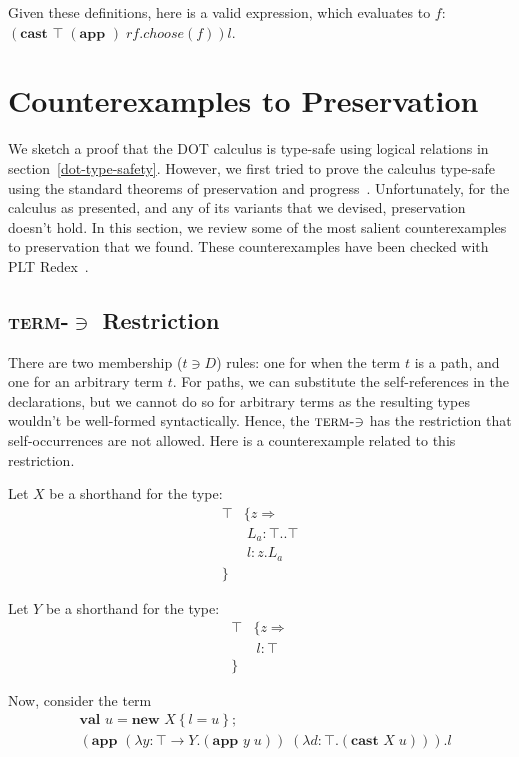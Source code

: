 \documentclass[9pt]{sigplanconf}
\newcommand{\mi}[1]{\mathit{#1}}
\newcommand{\tfun}{\rightarrow}
\newcommand{\mlrefine}[2]{\{#1 \Rightarrow #2 \}}
\newcommand{\ldefs}[1]{\left\{#1\right\}}
\newcommand{\abs}[3]{\lambda #1\!:\!#2.#3}
\newcommand{\mlnew}[3]{\textbf{val }#1 = \textbf{new }#2 ;\;\\&#3}
\newcommand{\Ldecl}[3]{#1 : #2..#3}%
\newcommand{\ldecl}[2]{#1 : #2}
\newcommand{\Top}{\top}%
\newcommand{\app}[2]{(\textbf{app }#1\;#2)}
\newcommand{\cast}[2]{(\textbf{cast }#1\;#2)}
\begin{document}
Given these definitions, here is a valid expression, which evaluates to $f$:
$\cast \Top \app {{\mi{rf.choose}}(f)} l$.

\section{Counterexamples to Preservation}\label{dot-preservation}

We sketch a proof that the DOT calculus is type-safe using logical
relations in section~\ref{dot-type-safety}. However, we first tried to
prove the calculus type-safe using the standard theorems of
preservation and progress~\cite{soundness,tapl}. Unfortunately, for
the calculus as presented, and any of its variants that we devised,
preservation doesn't hold. In this section, we review some of the most
salient counterexamples to preservation that we found. These
counterexamples have been checked with PLT Redex~\cite{plt_redex}.

\subsection{\texorpdfstring{\textsc{term-$\ni$}}{Term-Mem} Restriction}\label{term_mem}

There are two membership ($t \ni D$) rules: one for when the term $t$
is a path, and one for an arbitrary term $t$. For paths, we can
substitute the self-references in the declarations, but we cannot do
so for arbitrary terms as the resulting types wouldn't be well-formed
syntactically. Hence, the $\textsc{term-$\ni$}$ has the restriction
that self-occurrences are not allowed. Here is a counterexample related
to this restriction.

Let $X$ be a shorthand for the type:
\begin{align*}
\Top & \mlrefine z {\\
&\ \Ldecl {L_a} \Top \Top\\
&\ \ldecl l {z.L_a}\\
}&
\end{align*}

Let $Y$ be a shorthand for the type:
\begin{align*}
\Top & \mlrefine z {\\
&\ \ldecl l \Top\\
}&
\end{align*}

Now, consider the term
\begin{align*}
&\mlnew u {X \ldefs{ l = u }}{
\app {(\abs y {\Top \tfun Y} {\app y u})} {(\abs d \Top {\cast X u})}.l
}
\end{align*}
\end{document}
